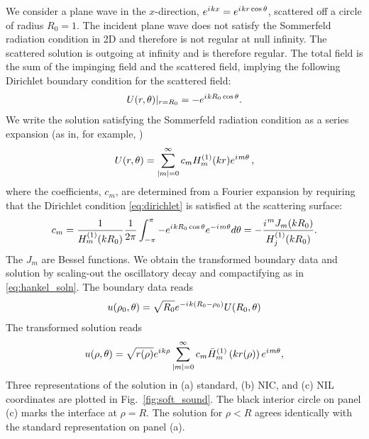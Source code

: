 \documentclass[final,onefignum,onetabnum]{siamart190516}
\newcommand{\iu}{{i\mkern1mu}}
\begin{document}
We consider a plane wave in the $x$-direction, $e^{\iu k x} = e^{\iu k r \cos\theta}$, scattered off a circle of radius $R_0=1$. The incident plane wave does not satisfy the Sommerfeld radiation condition in 2D and therefore is not regular at null infinity. The scattered solution is outgoing at infinity and is therefore regular. The total field is the sum of the impinging field and the scattered field, implying the following Dirichlet boundary condition for the scattered field:
\begin{equation}\label{eq:dirichlet}
	U(r,\theta)|_{r=R_0} = - e^{\iu k R_0 \cos\theta}.
\end{equation}
We write the solution satisfying the Sommerfeld radiation condition as a series expansion (as in, for example, \cite{britt2010compact, yang2021truly})
\[ U(r,\theta) =  \sum_{|m|=0}^{\infty} c_m H_{m}^{(1)}(k r) e^{\iu m \theta} \,, \]
where the coefficients, $c_m$, are determined from a Fourier expansion by requiring that the Dirichlet condition \eqref{eq:dirichlet} is satisfied at the scattering surface:
\[ c_m = \frac{1}{H_{m}^{(1)}(k R_0)} \frac{1}{2\pi} \int_{-\pi}^{\pi} -e^{\iu k R_0 \cos\theta} e^{-\iu m \theta} d\theta = 
- \frac{\iu^m J_m(k R_0)}{H_{j}^{(1)}(k R_0)}. \]
The $J_m$ are Bessel functions. We obtain the transformed boundary data and solution by scaling-out the oscillatory decay and compactifying as in \eqref{eq:hankel_soln}. The boundary data reads
\[ u(\rho_0,\theta)= \sqrt{R_0} e^{-\iu k (R_0-\rho_0)} U(R_0,\theta) %
\]
The transformed solution reads
\begin{equation}\label{eq:soft_soln}
	u(\rho,\theta) = \sqrt{r(\rho)} e^{\iu k\rho} \sum_{|m|=0}^{\infty} c_m \bar{H}_{m}^{(1)}\left(k r(\rho)\right) e^{\iu m \theta},
\end{equation}
Three representations of the solution in (a) standard, (b) NIC, and (c) NIL coordinates are plotted in Fig.~\ref{fig:soft_sound}. The black interior circle on panel (c) marks the interface at $\rho=R$. The solution for $\rho<R$ agrees identically with the standard representation on panel (a). 
\end{document}
